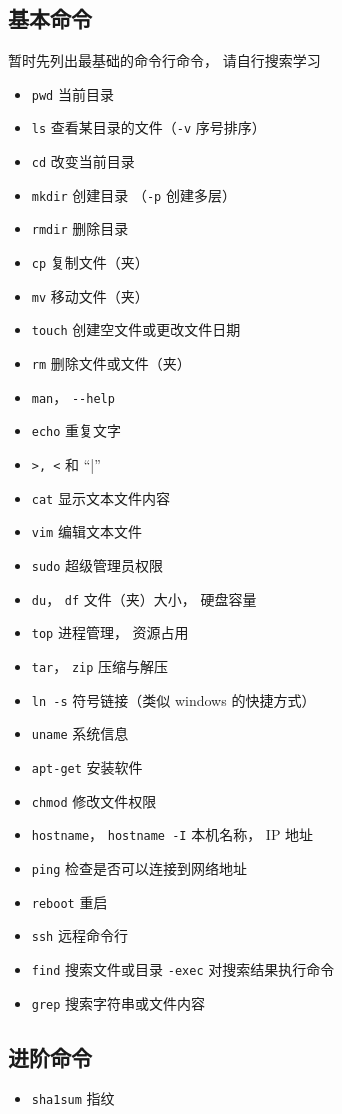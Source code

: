 \subsection{基本命令}
暂时先列出最基础的命令行命令， 请自行搜索学习
\begin{itemize}
\item \lstinline|pwd| 当前目录
\item \lstinline|ls| 查看某目录的文件（\lstinline|-v| 序号排序）
\item \lstinline|cd| 改变当前目录
\item \lstinline|mkdir| 创建目录 （\lstinline|-p| 创建多层）
\item \lstinline|rmdir| 删除目录
\item \lstinline|cp| 复制文件（夹）
\item \lstinline|mv| 移动文件（夹）
\item \lstinline|touch| 创建空文件或更改文件日期
\item \lstinline|rm| 删除文件或文件（夹）
\item \lstinline|man|， \lstinline|--help|
\item \lstinline|echo| 重复文字
\item \lstinline|>, <| 和 “|”
\item \lstinline|cat| 显示文本文件内容
\item \lstinline|vim| 编辑文本文件
\item \lstinline|sudo| 超级管理员权限
\item \lstinline|du|， \lstinline|df| 文件（夹）大小， 硬盘容量
\item \lstinline|top| 进程管理， 资源占用
\item \lstinline|tar|， \lstinline|zip| 压缩与解压
\item \lstinline|ln -s| 符号链接（类似 windows 的快捷方式）
\item \lstinline|uname| 系统信息
\item \lstinline|apt-get| 安装软件
\item \lstinline|chmod| 修改文件权限
\item \lstinline|hostname|， \lstinline|hostname -I| 本机名称， IP 地址
\item \lstinline|ping| 检查是否可以连接到网络地址
\item \lstinline|reboot| 重启
\item \lstinline|ssh| 远程命令行
\item \lstinline|find| 搜索文件或目录 \lstinline|-exec| 对搜索结果执行命令
\item \lstinline|grep| 搜索字符串或文件内容
\end{itemize}

\subsection{进阶命令}
\begin{itemize}
\item \lstinline|sha1sum| 指纹
\end{itemize}

